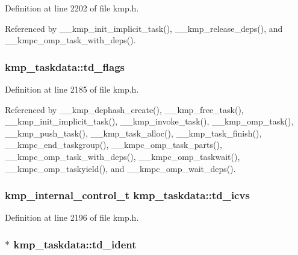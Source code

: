 Definition at line 2202 of file kmp.\-h.



Referenced by \-\_\-\-\_\-kmp\-\_\-init\-\_\-implicit\-\_\-task(), \-\_\-\-\_\-kmp\-\_\-release\-\_\-deps(), and \-\_\-\-\_\-kmpc\-\_\-omp\-\_\-task\-\_\-with\-\_\-deps().

\hypertarget{structkmp__taskdata_aa6380b6723d2482345a1e6cffcd15e9f}{
\subsubsection[{td\-\_\-flags}]{ kmp\-\_\-taskdata\-::td\-\_\-flags}}\label{structkmp__taskdata_aa6380b6723d2482345a1e6cffcd15e9f}


Definition at line 2185 of file kmp.\-h.



Referenced by \-\_\-\-\_\-kmp\-\_\-dephash\-\_\-create(), \-\_\-\-\_\-kmp\-\_\-free\-\_\-task(), \-\_\-\-\_\-kmp\-\_\-init\-\_\-implicit\-\_\-task(), \-\_\-\-\_\-kmp\-\_\-invoke\-\_\-task(), \-\_\-\-\_\-kmp\-\_\-omp\-\_\-task(), \-\_\-\-\_\-kmp\-\_\-push\-\_\-task(), \-\_\-\-\_\-kmp\-\_\-task\-\_\-alloc(), \-\_\-\-\_\-kmp\-\_\-task\-\_\-finish(), \-\_\-\-\_\-kmpc\-\_\-end\-\_\-taskgroup(), \-\_\-\-\_\-kmpc\-\_\-omp\-\_\-task\-\_\-parts(), \-\_\-\-\_\-kmpc\-\_\-omp\-\_\-task\-\_\-with\-\_\-deps(), \-\_\-\-\_\-kmpc\-\_\-omp\-\_\-taskwait(), \-\_\-\-\_\-kmpc\-\_\-omp\-\_\-taskyield(), and \-\_\-\-\_\-kmpc\-\_\-omp\-\_\-wait\-\_\-deps().

\hypertarget{structkmp__taskdata_abcb9336b26be5ded3ee98a71c1ce3762}{
\subsubsection[{td\-\_\-icvs}]{ {\bf kmp\-\_\-internal\-\_\-control\-\_\-t} kmp\-\_\-taskdata\-::td\-\_\-icvs}}\label{structkmp__taskdata_abcb9336b26be5ded3ee98a71c1ce3762}


Definition at line 2196 of file kmp.\-h.

\hypertarget{structkmp__taskdata_a80a962f07e81cde9797d70decdd6119d}{
\subsubsection[{td\-\_\-ident}]{$\ast$ kmp\-\_\-taskdata\-::td\-\_\-ident}}\label{structkmp__taskdata_a80a962f07e81cde9797d70decdd6119d}


